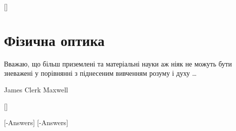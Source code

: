 \documentclass[%
biblatex,%
]{ProblemBook}
\begin{document}
%
\multiinclude{\ChaptersOne}[]





\part{Фізична оптика}
\epigraph{\Annabelle  Вважаю, що більш приземлені та матеріальні науки аж ніяк не можуть бути зневажені у порівнянні з піднесеним вивченням розуму і духу \ldots}{James Clerk Maxwell}
%
\multiinclude{\ChaptersTwo}[]






\answers
\multiinclude{\ChaptersOne}[-Answers]
\multiinclude{\ChaptersTwo}[-Answers]







\appendix
%











\clearpage\pagestyle{bibliography}
\end{document}
